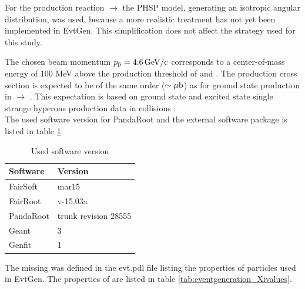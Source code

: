For the production reaction \pbarpSystem $\rightarrow$ \excitedcascade\anticascade the PHSP model, 
generating an isotropic angular distribution, was used,
because a more realistic treatment has not yet been implemented in EvtGen. 
This simplification does not affect the strategy used for this study.

The chosen beam momentum $p_{\bar{\textnormal{p}}} = 4.6\, \textnormal{GeV/c}$ corresponds to a center-of-mass energy 
of 100 MeV above the production threshold of \excitedcascade and \anticascade.
The production cross section is expected to be of the same order ($\sim \mu\textnormal{b}$) as for ground 
state \cascade production in \pbarpSystem $\rightarrow$ \cascade\anticascade \cite{PANDAphysics2009}.
This expectation is based on ground state and excited state single strange hyperons production data in \pbarpSystem collisions \cite{CERN}.
\\

The used software version for PandaRoot and the external software package is listed in table \ref{tab:eventgeneration_software}.

\begin{table}[tb]
	\centering
	\caption{Used software version}
	\label{tab:eventgeneration_software}
	\begin{tabular}{ll}
		\hline
		Software & Version \\
		\hline
		\hline
		FairSoft & mar15\\
		FairRoot & v-15.03a \\
		PandaRoot & trunk revision 28555 \\
		Geant & 3\\
		Genfit & 1\\\hline
			 
	\end{tabular}
\end{table}


The missing \excitedcascade was defined in the evt.pdl file listing the properties of particles used in EvtGen. 
The properties of \excitedcascade are listed in table \ref{tab:eventgeneration_Xivalues}.


